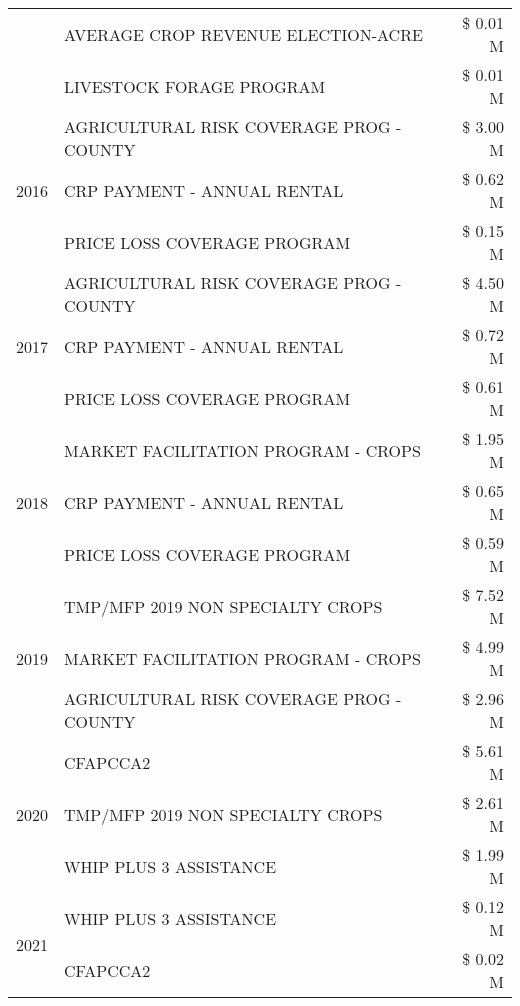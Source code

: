 \begin{tabular}{llr}
 & AVERAGE CROP REVENUE ELECTION-ACRE & \$ 0.01 M \\
 & LIVESTOCK FORAGE PROGRAM & \$ 0.01 M \\
\cline{1-3}
\multirow[t]{3}{*}{2016} & AGRICULTURAL RISK COVERAGE PROG - COUNTY & \$ 3.00 M \\
 & CRP PAYMENT - ANNUAL RENTAL & \$ 0.62 M \\
 & PRICE LOSS COVERAGE PROGRAM & \$ 0.15 M \\
\cline{1-3}
\multirow[t]{3}{*}{2017} & AGRICULTURAL RISK COVERAGE PROG - COUNTY & \$ 4.50 M \\
 & CRP PAYMENT - ANNUAL RENTAL & \$ 0.72 M \\
 & PRICE LOSS COVERAGE PROGRAM & \$ 0.61 M \\
\cline{1-3}
\multirow[t]{3}{*}{2018} & MARKET FACILITATION PROGRAM - CROPS & \$ 1.95 M \\
 & CRP PAYMENT - ANNUAL RENTAL & \$ 0.65 M \\
 & PRICE LOSS COVERAGE PROGRAM & \$ 0.59 M \\
\cline{1-3}
\multirow[t]{3}{*}{2019} & TMP/MFP 2019 NON SPECIALTY CROPS & \$ 7.52 M \\
 & MARKET FACILITATION PROGRAM - CROPS & \$ 4.99 M \\
 & AGRICULTURAL RISK COVERAGE PROG - COUNTY & \$ 2.96 M \\
\cline{1-3}
\multirow[t]{3}{*}{2020} & CFAPCCA2 & \$ 5.61 M \\
 & TMP/MFP 2019 NON SPECIALTY CROPS & \$ 2.61 M \\
 & WHIP PLUS 3 ASSISTANCE & \$ 1.99 M \\
\cline{1-3}
\multirow[t]{2}{*}{2021} & WHIP PLUS 3 ASSISTANCE & \$ 0.12 M \\
 & CFAPCCA2 & \$ 0.02 M \\
\cline{1-3}
\bottomrule
\end{tabular}
